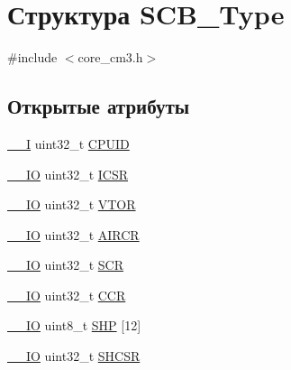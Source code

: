 \hypertarget{struct_s_c_b___type}{}\section{Структура S\+C\+B\+\_\+\+Type}
\label{struct_s_c_b___type}


{\ttfamily \#include $<$core\+\_\+cm3.\+h$>$}

\subsection*{Открытые атрибуты}
\begin{DoxyCompactItemize}
\item 
\mbox{\hyperlink{group___c_m_s_i_s___c_m3__core__definitions_gaf63697ed9952cc71e1225efe205f6cd3}{\+\_\+\+\_\+I}} uint32\+\_\+t \mbox{\hyperlink{struct_s_c_b___type_afa7a9ee34dfa1da0b60b4525da285032}{C\+P\+U\+ID}}
\item 
\mbox{\hyperlink{group___c_m_s_i_s___c_m3__core__definitions_gaec43007d9998a0a0e01faede4133d6be}{\+\_\+\+\_\+\+IO}} uint32\+\_\+t \mbox{\hyperlink{struct_s_c_b___type_a3e66570ab689d28aebefa7e84e85dc4a}{I\+C\+SR}}
\item 
\mbox{\hyperlink{group___c_m_s_i_s___c_m3__core__definitions_gaec43007d9998a0a0e01faede4133d6be}{\+\_\+\+\_\+\+IO}} uint32\+\_\+t \mbox{\hyperlink{struct_s_c_b___type_a0faf96f964931cadfb71cfa54e051f6f}{V\+T\+OR}}
\item 
\mbox{\hyperlink{group___c_m_s_i_s___c_m3__core__definitions_gaec43007d9998a0a0e01faede4133d6be}{\+\_\+\+\_\+\+IO}} uint32\+\_\+t \mbox{\hyperlink{struct_s_c_b___type_a6ed3c9064013343ea9fd0a73a734f29d}{A\+I\+R\+CR}}
\item 
\mbox{\hyperlink{group___c_m_s_i_s___c_m3__core__definitions_gaec43007d9998a0a0e01faede4133d6be}{\+\_\+\+\_\+\+IO}} uint32\+\_\+t \mbox{\hyperlink{struct_s_c_b___type_abfad14e7b4534d73d329819625d77a16}{S\+CR}}
\item 
\mbox{\hyperlink{group___c_m_s_i_s___c_m3__core__definitions_gaec43007d9998a0a0e01faede4133d6be}{\+\_\+\+\_\+\+IO}} uint32\+\_\+t \mbox{\hyperlink{struct_s_c_b___type_a6d273c6b90bad15c91dfbbad0f6e92d8}{C\+CR}}
\item 
\mbox{\hyperlink{group___c_m_s_i_s___c_m3__core__definitions_gaec43007d9998a0a0e01faede4133d6be}{\+\_\+\+\_\+\+IO}} uint8\+\_\+t \mbox{\hyperlink{struct_s_c_b___type_af6336103f8be0cab29de51daed5a65f4}{S\+HP}} \mbox{[}12\mbox{]}
\item 
\mbox{\hyperlink{group___c_m_s_i_s___c_m3__core__definitions_gaec43007d9998a0a0e01faede4133d6be}{\+\_\+\+\_\+\+IO}} uint32\+\_\+t \mbox{\hyperlink{struct_s_c_b___type_ae9891a59abbe51b0b2067ca507ca212f}{S\+H\+C\+SR}}

\end{DoxyCompactItemize}
